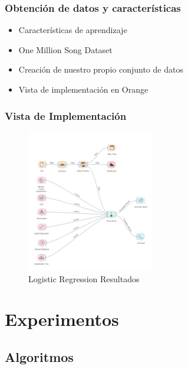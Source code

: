 \documentclass{beamer}
\begin{document}
\begin{frame}
\frametitle{Obtenci\'{o}n de datos y caracter\'{i}sticas}
\begin{itemize}
\item Caracter\'{i}sticas de aprendizaje
\item One Million Song Dataset
\item Creaci\'{o}n de nuestro propio conjunto de datos
\item Vista de implementaci\'{o}n en Orange
\end{itemize}
\end{frame}


\begin{frame}
\frametitle{Vista de Implementaci\'{o}n}
\begin{figure}[ht]
  \caption{Logistic Regression Resultados}
  \centering
    \includegraphics[width=0.5\textwidth]{Images/Vista}
\end{figure}
\end{frame}

\section{Experimentos} %

\subsection{Algoritmos} %
\end{document}
